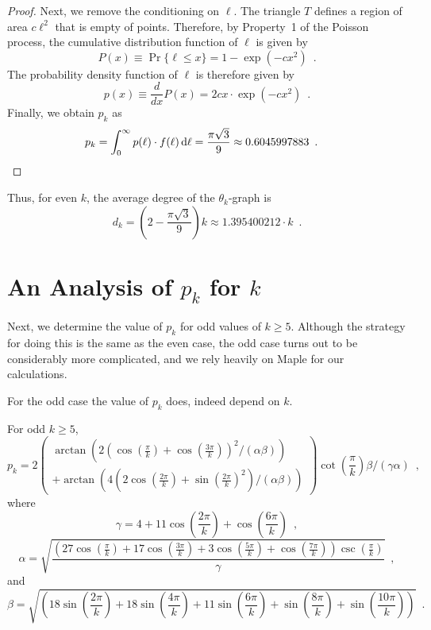 \documentclass{patmorin}
\begin{document}
\begin{proof}
  Next, we remove the conditioning on $\ell$.  The triangle $T$ defines a
  region of area $c\ell^2$ that is empty of points.  Therefore,
  by Property~1 of the Poisson process, the cumulative distribution
  function of $\ell$ is given by
  \[
    P(x) \equiv \Pr\{\ell \le x\} = 1-\exp(-cx^2) \enspace .
  \]
  The probability density function of $\ell$ is therefore given by 
  \[
     p(x) \equiv \frac{d}{dx}P(x) =
     2cx\cdot\exp(-cx^2) \enspace .
  \]
  Finally, we obtain $p_k$ as 
  \begin{align*}
     p_k = \int_0^\infty p(\ell)\cdot f(\ell)\,\mathrm{d}\ell 
     = \frac{\pi\sqrt{3}}{9}
      \approx 0.6045997883  \enspace . & \qedhere
  \end{align*}
\end{proof}

Thus, for even $k$, the average degree of the $\theta_k$-graph is 
\[ d_k = \left(2-\frac{\pi\sqrt{3}}{9}\right)k \approx 1.395400212\cdot k \enspace . \]

\section{An Analysis of $p_k$ for $k$}

Next, we determine the value of $p_k$ for odd values of
$k\ge 5$.  Although the strategy for doing this is the same as the even
case, the odd case turns out to be considerably more complicated, and
we rely heavily on Maple for our calculations.

For the odd case the value of $p_k$ does, indeed depend on $k$.

\begin{lem}
  For odd $k\ge 5$,
\[
p_k = 
2
\left(\begin{array}{l}
  \arctan\left(
     2\left(\cos\left(\frac{\pi }{k}\right)
       +\cos\left(\frac{3 \pi }{k}\right)\right)^2 / (\alpha\beta) 
  \right) \\
   + \arctan\left(
       4 \left(2 \cos\left(\frac{2 \pi }{k}\right)
       +\sin\left(\frac{2 \pi }{k}\right)^2\right)/(\alpha\beta) 
     \right)
  \end{array}
\right)
\cot\left(\frac{\pi }{k}\right) 
\beta
/
\left(\gamma \alpha\right)\enspace ,
\]
where
\[
\gamma =4+11 \cos\left(\frac{2 \pi }{k}\right)+\cos\left(\frac{6 \pi }{k}\right) \enspace ,
\]
\[
\alpha = 
\sqrt{\frac{\left(27 \cos\left(\frac{\pi }{k}\right)+17 \cos\left(\frac{3 \pi }{k}\right)+3 \cos\left(\frac{5 \pi }{k}\right)+\cos\left(\frac{7 \pi }{k}\right)\right) \csc\left(\frac{\pi }{k}\right)}{\gamma}} \enspace ,
\]
and
\[
\beta = \sqrt{\left(18 \sin\left(\frac{2 \pi }{k}\right)+18 \sin\left(\frac{4 \pi }{k}\right)+11 \sin\left(\frac{6 \pi }{k}\right)+\sin\left(\frac{8 \pi }{k}\right)+\sin\left(\frac{10 \pi }{k}\right)\right)} \enspace .
\]
\end{lem}
\end{document}
